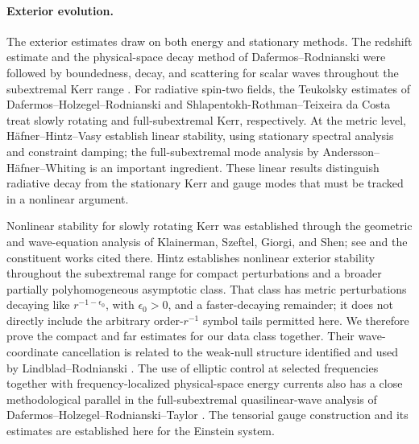 \paragraph{Exterior evolution.}
The exterior estimates draw on both energy and stationary methods.
The redshift estimate and the physical-space decay method of
Dafermos--Rodnianski
\cite{DafermosRodnianski2009,DafermosRodnianski2010} were followed by
boundedness, decay, and scattering for scalar waves throughout the
subextremal Kerr range
\cite{DafermosRodnianskiShlapentokhRothman2016,DafermosRodnianskiShlapentokhRothman2018}.
For radiative spin-two fields, the Teukolsky estimates of
Dafermos--Holzegel--Rodnianski \cite{DafermosHolzegelRodnianski2019}
and Shlapentokh-Rothman--Teixeira da Costa
\cite{ShlapentokhRothmanTeixeiraDaCosta2023} treat slowly rotating and
full-subextremal Kerr, respectively. At the metric level,
H\"afner--Hintz--Vasy \cite{HafnerHintzVasy2021,HHV2025} establish
linear stability, using stationary spectral analysis and constraint
damping; the full-subextremal mode analysis by
Andersson--H\"afner--Whiting \cite{AnderssonHafnerWhiting2026}
is an important ingredient. These linear results distinguish radiative
decay from the stationary Kerr and gauge modes that must be tracked
in a nonlinear argument.

Nonlinear stability for slowly rotating Kerr was established through
the geometric and wave-equation analysis of Klainerman, Szeftel,
Giorgi, and Shen; see
\cite{KlainermanSzeftel2021,GiorgiKlainermanSzeftel2022} and the
constituent works cited there. Hintz \cite{Hintz2026} establishes
nonlinear exterior stability throughout the subextremal range for
compact perturbations and a broader partially polyhomogeneous
asymptotic class. That class has metric perturbations decaying like
\(r^{-1-\epsilon_0}\), with \(\epsilon_0>0\), and a faster-decaying
remainder; it does not directly include the arbitrary order-\(r^{-1}\)
symbol tails permitted here. We therefore prove the compact and far
estimates for our data class together. Their wave-coordinate
cancellation is related to the weak-null structure identified and
used by Lindblad--Rodnianski
\cite{LindbladRodnianski2003,LindbladRodnianski2010}.
The use of elliptic control at selected frequencies together with
frequency-localized physical-space energy currents also has a close methodological
parallel in the full-subextremal quasilinear-wave analysis of
Dafermos--Holzegel--Rodnianski--Taylor
\cite{DafermosHolzegelRodnianskiTaylor2024}. The tensorial gauge
construction and its estimates are established here for the
Einstein system.


